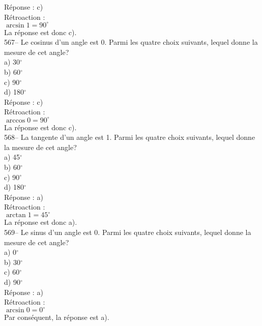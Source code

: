﻿\documentclass[letterpaper, 12pt]{article}
\begin{document}
R\'eponse : c)\\

R\'etroaction : \\
$\arcsin 1 = 90^{\circ}$\\
La r\'eponse est donc c).\\

567-- Le cosinus d'un angle est 0.  Parmi les quatre choix suivants, lequel
donne la mesure de cet angle?\\
a) 30$^{\circ}$\\
b) 60$^{\circ}$\\
c) 90$^{\circ}$\\
d) 180$^{\circ}$\\

R\'eponse : c)\\

R\'etroaction : \\
$\arccos 0 = 90^{\circ}$\\
La r\'eponse est donc c).\\

568-- La tangente d'un angle est 1.  Parmi les quatre choix suivants, lequel
donne la mesure de cet angle?\\
a) 45$^{\circ}$\\
b) 60$^{\circ}$\\
c) 90$^{\circ}$\\
d) 180$^{\circ}$\\

R\'eponse : a)\\

R\'etroaction : \\
$\arctan 1 = 45^{\circ}$\\
La r\'eponse est donc a).\\

569-- Le sinus d'un angle est 0.  Parmi les quatre choix suivants, lequel
donne la mesure de cet angle?\\
a) 0$^{\circ}$\\
b) 30$^{\circ}$\\
c) 60$^{\circ}$\\
d) 90$^{\circ}$\\

R\'eponse : a)\\

R\'etroaction : \\
$\arcsin 0 = 0^{\circ}$\\
Par cons\'equent, la r\'eponse est a).\\
\end{document}
